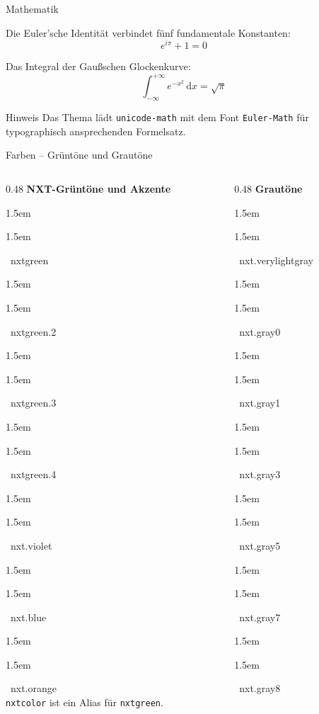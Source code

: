 \documentclass[aspectratio=169]{beamer}
\newcommand{\cs}[1]{%
  \colorbox{#1}{\kern1.5em\strut\kern1.5em}~{\footnotesize\ttfamily #1}%
}
\begin{document}
\begin{frame}{Mathematik}

Die Euler'sche Identität verbindet fünf fundamentale Konstanten:
\[
  e^{i\pi} + 1 = 0
\]

\bigskip

Das Integral der Gaußschen Glockenkurve:
\[
  \int_{-\infty}^{+\infty} e^{-x^2}\,\mathrm{d}x = \sqrt{\pi}
\]

\bigskip

\begin{block}{Hinweis}
  Das Thema lädt \texttt{unicode-math} mit dem Font
  \texttt{Euler-Math} für typographisch ansprechenden Formelsatz.
\end{block}

\end{frame}

\begin{frame}{Farben – Grüntöne und Grautöne}

\begin{columns}[T]
  \begin{column}{0.48\textwidth}
    \textbf{NXT-Grüntöne und Akzente}\\[4pt]
    \cs{nxtgreen}\\[3pt]
    \cs{nxtgreen.2}\\[3pt]
    \cs{nxtgreen.3}\\[3pt]
    \cs{nxtgreen.4}\\[3pt]
    \cs{nxt.violet}\\[3pt]
    \cs{nxt.blue}\\[3pt]
    \cs{nxt.orange}\\[6pt]
    {\footnotesize\texttt{nxtcolor} ist ein Alias für \texttt{nxtgreen}.}
  \end{column}
  \begin{column}{0.48\textwidth}
    \textbf{Grautöne}\\[4pt]
    \cs{nxt.verylightgray}\\[3pt]
    \cs{nxt.gray0}\\[3pt]
    \cs{nxt.gray1}\\[3pt]
    \cs{nxt.gray3}\\[3pt]
    \cs{nxt.gray5}\\[3pt]
    \cs{nxt.gray7}\\[3pt]
    \cs{nxt.gray8}
  \end{column}
\end{columns}

\end{frame}
\end{document}
